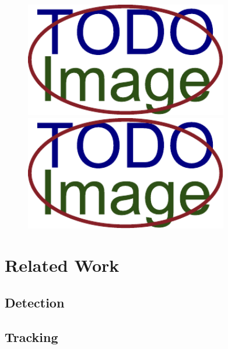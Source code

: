 \begin{figure}[t]\centering %
	\centering
	\includegraphics[width=0.45\linewidth, height=5cm]{fig/placeholder.pdf}
	\includegraphics[width=0.45\linewidth, height=5cm]{fig/placeholder.pdf}
	\caption{}
	\label{fig:WidePicture}
\end{figure}

\vata[4]

\chapter{Related Work}

\section{Detection}

\section{Tracking}

